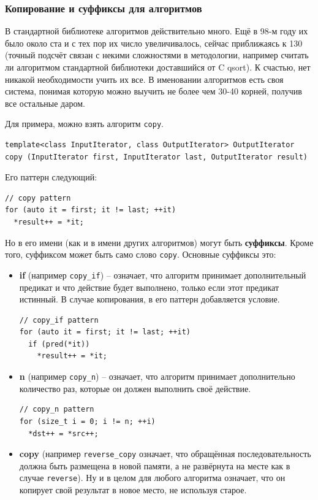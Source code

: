 \documentclass[a4paper,12pt,oneside]{article}
\begin{document}
\subsubsection{Копирование и суффиксы для алгоритмов}

В стандартной библиотеке алгоритмов действительно много. Ещё в 98-м году их было около ста и с тех пор их число увеличивалось, сейчас приближаясь к 130 (точный подсчёт связан с некими сложностями в методологии, например считать ли алгоритмом стандартной библиотеки доставшийся от C qsort). К счастью, нет никакой необходимости учить их все. В именовании алгоритмов есть своя система, понимая которую можно выучить не более чем 30-40 корней, получив все остальные даром.

Для примера, можно взять алгоритм \lstinline!copy!. 

\begin{lstlisting}
template<class InputIterator, class OutputIterator> OutputIterator
copy (InputIterator first, InputIterator last, OutputIterator result)
\end{lstlisting}

Его паттерн следующий:

\begin{lstlisting}
// copy pattern
for (auto it = first; it != last; ++it)
  *result++ = *it;
\end{lstlisting}

Но в его имени (как и в имени других алгоритмов) могут быть \textbf{суффиксы}. Кроме того, суффиксом может быть само слово \lstinline!copy!. Основные суффиксы это:

\begin{itemize}
\item \textbf{if} (например \lstinline!copy_if!) -- означает, что алгоритм принимает дополнительный предикат и что действие будет выполнено, только если этот предикат истинный. В случае копирования, в его паттерн добавляется условие.

\begin{lstlisting}
// copy_if pattern
for (auto it = first; it != last; ++it)
  if (pred(*it))
    *result++ = *it;
\end{lstlisting}

\item \textbf{n} (например \lstinline!copy_n!) -- означает, что алгоритм принимает дополнительно количество раз, которые он должен выполнить своё действие.

\begin{lstlisting}
// copy_n pattern
for (size_t i = 0; i != n; ++i)
  *dst++ = *src++;
\end{lstlisting}

\item \textbf{copy} (например \lstinline!reverse_copy! означает, что обращённая последовательность должна быть размещена в новой памяти, а не развёрнута на месте как в случае \lstinline!reverse!). Ну и в целом для любого алгоритма означает, что он копирует свой результат в новое место, не используя старое.
\end{itemize}
\end{document}
